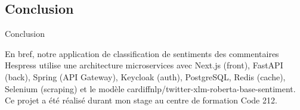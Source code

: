 \subsection{Conclusion}
\begin{frame}{Conclusion}

    En bref, notre application de classification de sentiments des commentaires Hespress utilise une architecture microservices avec Next.js (front), FastAPI (back), Spring (API Gateway), Keycloak (auth), PostgreSQL, Redis (cache), Selenium (scraping) et le modèle cardiffnlp/twitter-xlm-roberta-base-sentiment. Ce projet a été réalisé durant mon stage au centre de formation Code 212.
\end{frame}
